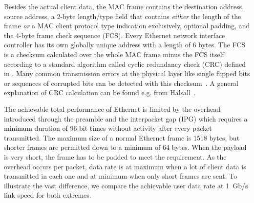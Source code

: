 \documentclass[a4paper, 11pt, oneside]{Thesis}  %
\begin{document}
Besides the actual client data, the MAC frame contains the destination address, source address, a 2-byte length/type field that contains \emph{either} the length of the frame \emph{or} a MAC client protocol type indication exclusively, optional padding, and the 4-byte frame check sequence (FCS). Every Ethernet network interface controller has its own globally unique address with a length of 6 bytes. The FCS is a checksum calculated over the whole MAC frame minus the FCS itself according to a standard algorithm called cyclic redundancy check (CRC) defined in \cite[clause 3.2.9]{Ethernet}. Many common transmission errors at the physical layer like single flipped bits or sequences of corrupted bits can be detected with this checksum~\cite{Computernetze}. A general explanation of CRC calculation can be found e.g. from Halsall~\cite{ComputerNetworking}.

The achievable total performance of Ethernet is limited by the overhead introduced through the preamble and the interpacket gap (IPG) which requires a minimum duration of 96 bit times without activity after every packet transmitted. The maximum size of a normal Ethernet frame is 1518 bytes, but shorter frames are permitted down to a minimum of 64 bytes. When the payload is very short, the frame has to be padded to meet the requirement. As the overhead occurs per packet, data rate is at maximum when a lot of client data is transmitted in each one and at minimum when only short frames are sent. To illustrate the vast difference, we compare the achievable user data rate at 1~Gb/s link speed for both extremes.
\end{document}
